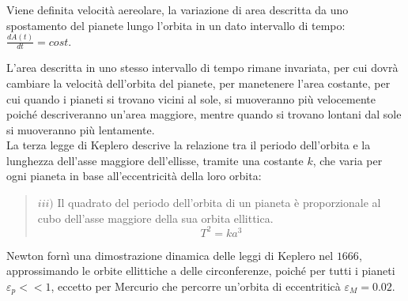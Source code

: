 \documentclass{article}
\numberwithin{equation}{subsection}
\begin{document}
Viene definita velocità aereolare, la variazione di area descritta da uno spostamento del pianete lungo l'orbita in un dato intervallo di tempo: 
$\displaystyle\frac{dA(t)}{dt}=cost.$

\begin{center}
\end{center}

L'area descritta in uno stesso intervallo di tempo rimane invariata, per cui dovrà cambiare la velocità dell'orbita del pianete, per manetenere l'area 
costante, per cui quando i pianeti si trovano vicini al sole, si muoveranno più velocemente poiché descriveranno un'area maggiore, mentre quando si 
trovano lontani dal sole si muoveranno più lentamente. \\

La terza legge di Keplero descrive la relazione tra il periodo dell'orbita e la lunghezza dell'asse maggiore dell'ellisse, tramite una costante 
$k$, che varia per ogni pianeta in base all'eccentricità della loro orbita: 
\begin{quotation}
    $iii)$ Il quadrato del periodo dell'orbita di un pianeta è proporzionale al cubo dell'asse maggiore della sua orbita ellittica.
    \begin{equation}
        T^2=ka^3
    \end{equation}
\end{quotation}

Newton fornì una dimostrazione dinamica delle leggi di Keplero nel $1666$, approssimando le orbite ellittiche a delle circonferenze, poiché 
per tutti i pianeti $\varepsilon_p<<1$, eccetto per Mercurio che percorre un'orbita di eccentriticà $\varepsilon_M=0.02$. 

\begin{center}
\end{center}
\end{document}
